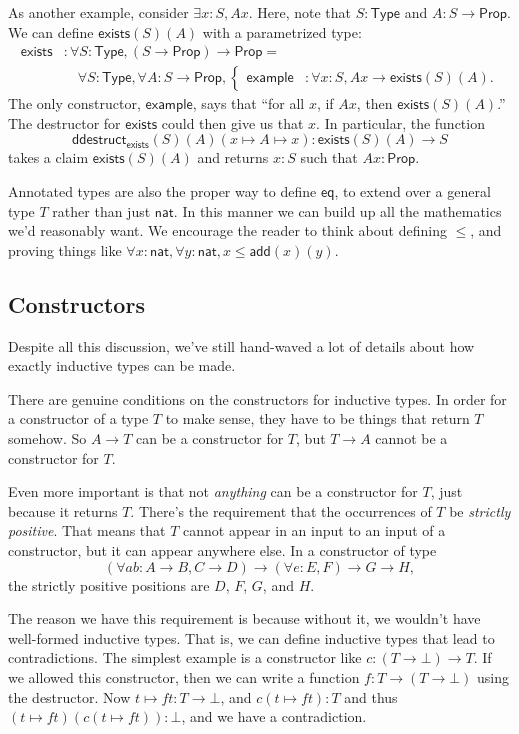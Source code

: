 \documentclass[11pt,paper=letter]{scrartcl}
\renewcommand{\sf}{\mathsf}
\newcommand{\false}{\bot}
\newcommand{\prop}{\mathsf{Prop}}
\newcommand{\type}{\mathsf{Type}}
\begin{document}
As another example, consider $\exists x: S, Ax$. Here, note that $S: \type$ and $A : S \to \prop$. We can define $\sf{exists}(S)(A)$ with a parametrized type:
\begin{align*}
\sf{exists}&: \forall S: \type, (S \to \prop) \to \prop =\\
&\quad\!\forall S: \type, \forall A:S \to \prop, \begin{cases}
  \sf{example}&: \forall x: S, Ax \to \sf{exists}(S)(A).
\end{cases}
\end{align*}
The only constructor, $\sf{example}$, says that ``for all $x$, if $Ax$, then $\sf{exists}(S)(A)$.'' The destructor for $\sf{exists}$ could then give us that $x$. In particular, the function \[
  \sf{ddestruct}_\sf{exists}(S)(A)(x \mapsto A \mapsto x) : \sf{exists}(S)(A) \to S
\]
takes a claim $\sf{exists}(S)(A)$ and returns $x : S$ such that $Ax : \prop$.

Annotated types are also the proper way to define $\sf{eq}$, to extend over a general type $T$ rather than just $\sf{nat}$. In this manner we can build up all the mathematics we'd reasonably want. We encourage the reader to think about defining $\le$, and proving things like $\forall x: \sf{nat}, \forall y: \sf{nat}, x \le \sf{add}(x)(y)$.

\subsection{Constructors}

Despite all this discussion, we've still hand-waved a lot of details about how exactly inductive types can be made.

There are genuine conditions on the constructors for inductive types. In order for a constructor of a type $T$ to make sense, they have to be things that return $T$ somehow. So $A \to T$ can be a constructor for $T$, but $T \to A$ cannot be a constructor for $T$.

Even more important is that not \emph{anything} can be a constructor for $T$, just because it returns $T$. There's the requirement that the occurrences of $T$ be \emph{strictly positive}. That means that $T$ cannot appear in an input to an input of a constructor, but it can appear anywhere else. In a constructor of type \[
\left(\forall ab: A \to B, C \to D\right) \to (\forall e: E, F) \to G \to H,
\]
the strictly positive positions are $D$, $F$, $G$, and $H$.

The reason we have this requirement is because without it, we wouldn't have well-formed inductive types. That is, we can define inductive types that lead to contradictions. The simplest example is a constructor like $c: (T \to \false) \to T$. If we allowed this constructor, then we can write a function $f : T \to (T \to \false)$ using the destructor. Now $t \mapsto ft : T \to \false$, and $c(t \mapsto ft) : T$ and thus $(t \mapsto ft)(c(t \mapsto ft)) : \false$, and we have a contradiction.
\end{document}
